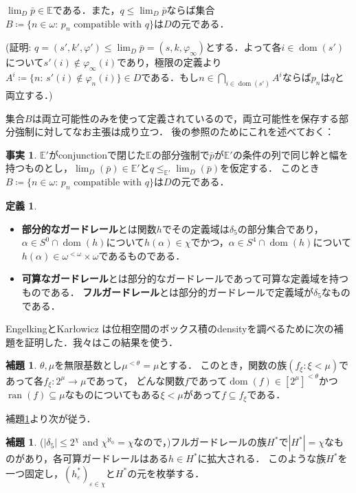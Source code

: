 \documentclass[uplatex,dvipdfmx]{jsarticle}
\newcommand{\range}{\operatorname{ran}}
\newcommand{\dom}{\operatorname{dom}}
\newcommand{\Eor}{\mathbb{E}}
\newcommand{\ve}{\varepsilon}
\renewcommand\subset{\subseteq}
\theoremstyle{definition}
\newtheorem{defi}[thm]{定義}
\newtheorem{lem}[thm]{補題}
\newtheorem{fact}[thm]{事実}
\begin{document}
	$\lim_D\bar p\in\Eor$である．また，$q\le \lim_D \bar p$ならば集合$B\coloneq\{ n\in \omega:\, p_n \text{ compatible with } q\}$は$D$の元である．
	
	(証明: $q=(s',k',\varphi')\le \lim_D\bar p=(s,k,\varphi_\infty)$とする．よって各$i\in\dom(s')$について$s'(i)\notin \varphi_\infty(i)$であり，極限の定義より$A^i \coloneq\{n:\, s'(i)\notin \varphi_n(i)\}\in D$である．もし$n\in\bigcap_{i\in\dom(s')} A^i$ならば$p_n$は$q$と両立する．)
	
	
	集合$B$は両立可能性のみを使って定義されているので，両立可能性を保存する部分強制に対してなお主張は成り立つ．
	後の参照のためにこれを述べておく：
	\begin{fact}\label{fact:blubb4}
		$\Eor'$がconjunctionで閉じた$\Eor$の部分強制で$\bar p$が$\Eor'$の条件の列で同じ幹と幅を持つものとし，$\lim_D(\bar p)\in \Eor'$と$q\le_{\Eor'} \lim_D(\bar p)$を仮定する．
		このとき
		$B\coloneq\{ n\in \omega:\, p_n \text{ compatible with } q\}$は$D$の元である．
	\end{fact}
		
		\begin{defi}
			\begin{itemize}
				\item \textbf{部分的なガードレール}とは関数$h$でその定義域は$\delta_5$の部分集合であり，$\alpha\in S^0\cap\dom(h)$について$h(\alpha)\in \chi$でかつ，$\alpha\in S^4\cap\dom(h)$について$h(\alpha)
				\in \omega^{<\omega}\times \omega$であるものである．
				\item \textbf{可算なガードレール}とは部分的なガードレールであって可算な定義域を持つものである．
				\textbf{フルガードレール}とは部分的ガードレールで定義域が$\delta_5$なものである．
			\end{itemize}
		\end{defi}
	
	EngelkingとKar{\l}owicz \cite{engelking1965some}は位相空間のボックス積のdensityを調べるために次の補題を証明した．我々はこの結果を使う．
	
	\begin{lem}\label{lem:ek}
		$\theta, \mu$を無限基数とし$\mu^{<\theta} = \mu$とする．
		このとき，関数の族$(f_\xi : \xi < \mu)$であって各$f_\xi \colon 2^\mu \to \mu$であって，
		どんな関数$f$であって$\dom(f) \in [2^\mu]^{<\theta}$かつ$\range(f) \subset \mu$なものについてもある$\xi < \mu$があって$f \subset f_\xi$である．
	\end{lem}

	補題\ref{lem:ek}より次が従う．

	\begin{lem}\label{use.EK}
		($|\delta_5|\le 2^\chi$ and $\chi^{\aleph_0}=\chi$なので，)フルガードレールの族$H^*$で$|H^*|=\chi$なものがあり，各可算ガードレールはある$h\in H^*$に拡大される． 
		このような族$H^*$を一つ固定し，$(h^*_\ve)_{\ve\in \chi}$と$H^*$の元を枚挙する．
	\end{lem}
\end{document}
